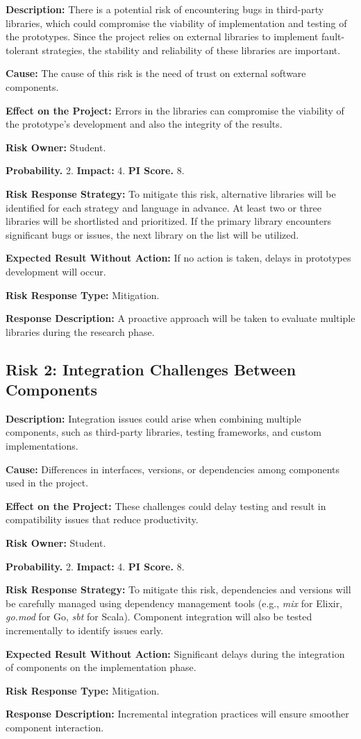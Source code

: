 \textbf{Description:} There is a potential risk of encountering bugs in third-party libraries, which could compromise the viability of implementation and testing of the prototypes. Since the project relies on external libraries to implement fault-tolerant strategies, the stability and reliability of these libraries are important.

\textbf{Cause:} The cause of this risk is the need of trust on external software components.

\textbf{Effect on the Project:} Errors in the libraries can compromise the viability of the prototype's development and also the integrity of the results.

\textbf{Risk Owner:} Student.

\textbf{Probability.} 2. \textbf{Impact:} 4. \textbf{PI Score.} 8.

\textbf{Risk Response Strategy:} To mitigate this risk, alternative libraries will be identified for each strategy and language in advance. At least two or three libraries will be shortlisted and prioritized. If the primary library encounters significant bugs or issues, the next library on the list will be utilized.

\textbf{Expected Result Without Action:} If no action is taken, delays in prototypes development will occur.

\textbf{Risk Response Type:} Mitigation.

\textbf{Response Description:} A proactive approach will be taken to evaluate multiple libraries during the research phase.


\subsection{Risk 2: Integration Challenges Between Components}

\textbf{Description:} Integration issues could arise when combining multiple components, such as third-party libraries, testing frameworks, and custom implementations.

\textbf{Cause:} Differences in interfaces, versions, or dependencies among components used in the project.

\textbf{Effect on the Project:} These challenges could delay testing and result in compatibility issues that reduce productivity.

\textbf{Risk Owner:} Student.

\textbf{Probability.} 2. \textbf{Impact:} 4. \textbf{PI Score.} 8.

\textbf{Risk Response Strategy:} To mitigate this risk, dependencies and versions will be carefully managed using dependency management tools (e.g., \textit{mix} for Elixir, \textit{go.mod} for Go,  \textit{sbt} for Scala). Component integration will also be tested incrementally to identify issues early.

\textbf{Expected Result Without Action:} Significant delays during the integration of components on the implementation phase.

\textbf{Risk Response Type:} Mitigation.

\textbf{Response Description:} Incremental integration practices will ensure smoother component interaction.